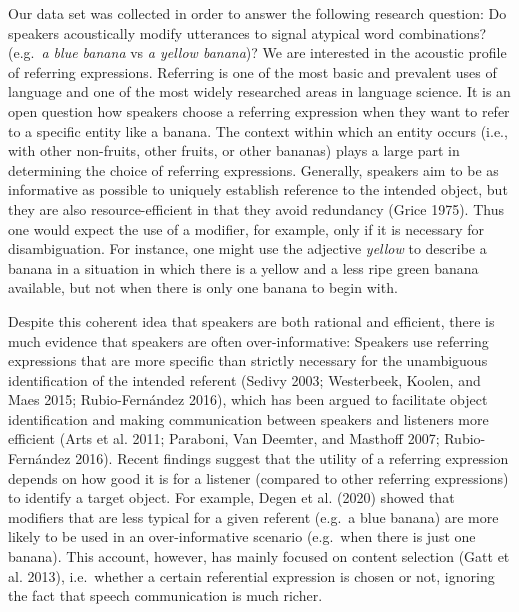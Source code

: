 \documentclass[
  12pt,
]{article}
\begin{document}
Our data set was collected in order to answer the following research question: Do speakers acoustically modify utterances to signal atypical word combinations? (e.g.~\emph{a blue banana} vs \emph{a yellow banana})?
We are interested in the acoustic profile of referring expressions.
Referring is one of the most basic and prevalent uses of language and one of the most widely researched areas in language science.
It is an open question how speakers choose a referring expression when they want to refer to a specific entity like a banana.
The context within which an entity occurs (i.e., with other non-fruits, other fruits, or other bananas) plays a large part in determining the choice of referring expressions.
Generally, speakers aim to be as informative as possible to uniquely establish reference to the intended object, but they are also resource-efficient in that they avoid redundancy (Grice 1975).
Thus one would expect the use of a modifier, for example, only if it is necessary for disambiguation.
For instance, one might use the adjective \emph{yellow} to describe a banana in a situation in which there is a yellow and a less ripe green banana available, but not when there is only one banana to begin with.

Despite this coherent idea that speakers are both rational and efficient, there is much evidence that speakers are often over-informative: Speakers use referring expressions that are more specific than strictly necessary for the unambiguous identification of the intended referent (Sedivy 2003; Westerbeek, Koolen, and Maes 2015; Rubio-Fernández 2016), which has been argued to facilitate object identification and making communication between speakers and listeners more efficient (Arts et al. 2011; Paraboni, Van Deemter, and Masthoff 2007; Rubio-Fernández 2016).
Recent findings suggest that the utility of a referring expression depends on how good it is for a listener (compared to other referring expressions) to identify a target object.
For example, Degen et al. (2020) showed that modifiers that are less typical for a given referent (e.g.~a blue banana) are more likely to be used in an over-informative scenario (e.g.~when there is just one banana).
This account, however, has mainly focused on content selection (Gatt et al. 2013), i.e.~whether a certain referential expression is chosen or not, ignoring the fact that speech communication is much richer.
\end{document}
